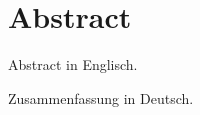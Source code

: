 \chapter{Abstract}

Abstract in Englisch.

\newpage

{\Large {}}\vspace{2.5cm}

Zusammenfassung in Deutsch.
